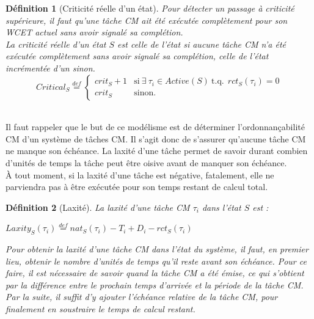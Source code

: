 \documentclass[12pt,a4paper,oneside]{book}
\theoremstyle{break}
\newtheorem{defin}{Définition}[chapter]
\theoremstyle{breakplain}
\begin{document}
\begin{defin}[Criticité réelle d'un état]
\label{spo:critical}
Pour détecter un passage à criticité supérieure, il faut qu'une tâche CM ait été exécutée complètement pour son WCET actuel sans avoir signalé sa complétion.\\

La criticité réelle d'un état $S$ est celle de l'état si aucune tâche CM n'a été exécutée complètement sans avoir signalé sa complétion, celle de l'état incrémentée d'un sinon.
$$
Critical_S \overset{def}{=} \left\{
    \begin{array}{ll}
        crit_S+1 & \mbox{si}\ \exists\ \tau_i \in Active(S)\ \mbox{t.q.}\ \ rct_S(\tau_i) = 0 \\
        crit_S & \mbox{sinon.}
    \end{array}
\right.
$$\\
\end{defin}

Il faut rappeler que le but de ce modélisme est de déterminer l'ordonnançabilité CM d'un système de tâches CM. Il s'agit donc de s'assurer qu'aucune tâche CM ne manque son échéance. La laxité d'une tâche permet de savoir durant combien d'unités de temps la tâche peut être oisive avant de manquer son échéance.\\À tout moment, si la laxité d'une tâche est négative, fatalement, elle ne parviendra pas à être exécutée pour son temps restant de calcul total.\\

\begin{defin}[Laxité]
\label{spo:laxity}
La laxité d'une tâche CM $\tau_i$ dans l'état $S$ est :

\begin{center}
$Laxity_S(\tau_i) \overset{def}{=} nat_S(\tau_i) -T_i + D_i - rct_S(\tau_i)$\\
\end{center}

Pour obtenir la laxité d'une tâche CM dans l'état du système, il faut, en premier lieu, obtenir le nombre d'unités de temps qu'il reste avant son échéance. Pour ce faire, il est nécessaire de savoir quand la tâche CM a été émise, ce qui s'obtient par la différence entre le prochain temps d'arrivée et la période de la tâche CM. Par la suite, il suffit d'y ajouter l'échéance relative de la tâche CM, pour finalement en soustraire le temps de calcul restant.\\
\end{defin}
\end{document}
